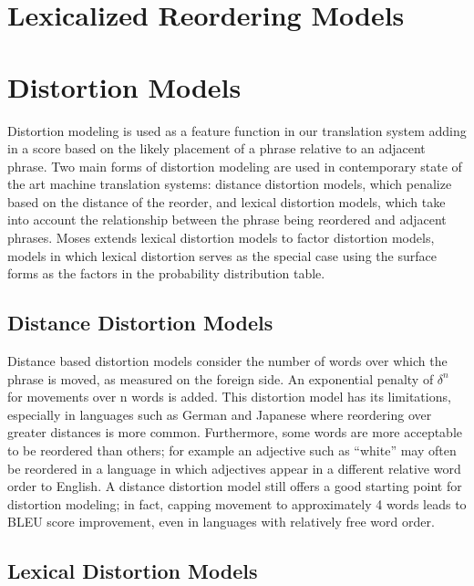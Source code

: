 \documentclass[11pt]{report}
\theoremstyle{plain}
\begin{document}
{\section{Lexicalized Reordering Models}
\section{Distortion Models} %
Distortion modeling is  used as a feature function in our translation system adding in a score based on the likely placement of a phrase relative to an adjacent phrase. Two main forms of distortion modeling are used in contemporary state of the art machine translation systems: distance distortion models, which penalize based on the distance of the reorder, and lexical distortion models, which take into account the relationship between the phrase being reordered and adjacent phrases. Moses extends lexical distortion models to factor distortion models, models in which lexical distortion serves as the special case using the surface forms as the factors in the probability distribution table.
\subsection{Distance Distortion Models}

Distance based distortion models consider the number of words over which the phrase is moved, as measured on the foreign side. An exponential penalty of $\delta^n$ for movements over n words is added.\cite{koehn:05} This distortion model has its limitations, especially in languages such as German and Japanese where reordering over greater distances is more common. Furthermore, some words are more acceptable to be reordered than others; for example an adjective such as ``white'' may often be reordered in a language in which adjectives appear in a different relative word order to English. A distance distortion model still offers a good starting point for distortion modeling; in fact, capping movement to approximately 4 words leads to BLEU score improvement, even in languages with relatively free word order.\cite{koehn:05}
\subsection{Lexical Distortion Models}

}
\end{document}
